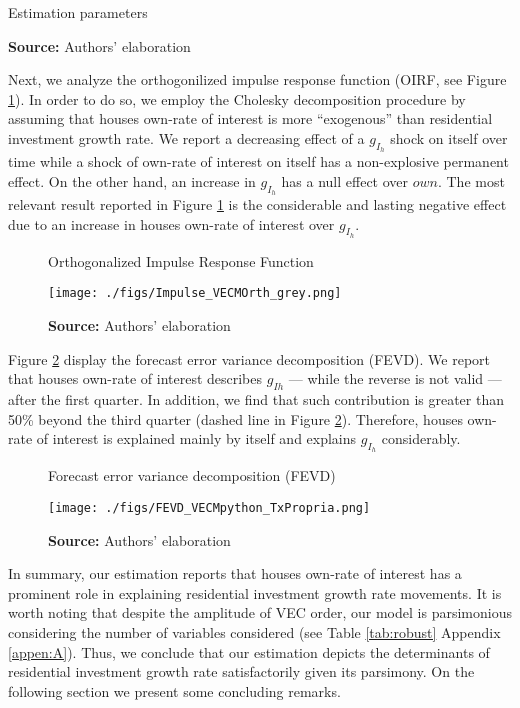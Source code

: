 \documentclass[12pt, a4paper]{article}
\begin{document}
\begin{table}[H]
	\caption{Estimation parameters}
	\centering
	
	\caption*{\textbf{Source:} Authors' elaboration}
\end{table}


Next, we analyze the orthogonilized impulse response function (OIRF, see Figure \ref{irf}).
In order to do so, we employ the Cholesky decomposition procedure by assuming that houses own-rate of interest is more ``exogenous'' than residential investment growth rate.
We report a decreasing effect of a \(g_{I_h}\) shock on itself over time while a shock of own-rate of interest on itself has a non-explosive permanent effect.
On the other hand, an increase in \(g_{I_h}\) has a null effect over \(own\).
The most relevant result reported in Figure \ref{irf} is the considerable and lasting negative effect due to an increase in houses own-rate of interest over \(g_{I_h}\).

\begin{figure}[H]
	\centering
	\caption{Orthogonalized Impulse Response Function}
	\label{irf}
	\texttt{[image: ./figs/Impulse\_VECMOrth\_grey.png]}
	\caption*{\textbf{Source:} Authors' elaboration}
\end{figure}

Figure \ref{fevd} display the forecast error variance decomposition (FEVD).
We report that houses own-rate of interest describes \(g_{Ih}\) --- while the reverse is not valid --- after the first quarter.
In addition, we find that such contribution is greater than 50\% beyond the third quarter (dashed line in Figure \ref{fevd}).
Therefore, houses own-rate of interest is explained mainly by itself and explains \(g_{I_h}\) considerably.

\begin{figure}[H]
	\centering
	\caption{Forecast error variance decomposition (FEVD)}
	\label{fevd}
	\texttt{[image: ./figs/FEVD\_VECMpython\_TxPropria.png]}
	\caption*{\textbf{Source:} Authors' elaboration}
\end{figure}


In summary, our estimation reports that houses own-rate of interest has a prominent role in explaining residential investment growth rate movements.
It is worth noting that despite the amplitude of VEC order, our model is parsimonious considering the number of variables considered (see Table \ref{tab:robust} Appendix \ref{appen:A}).
Thus, we conclude that our estimation depicts the determinants of residential investment growth rate satisfactorily given its parsimony.
On the following section we present some concluding remarks.
\end{document}
